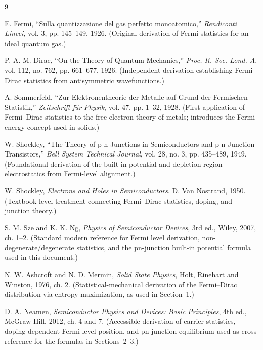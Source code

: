 \documentclass[11pt]{article}
\begin{document}
\begin{thebibliography}{9}

E. Fermi, ``Sulla quantizzazione del gas perfetto monoatomico,'' \emph{Rendiconti Lincei}, vol. 3, pp. 145--149, 1926. (Original derivation of Fermi statistics for an ideal quantum gas.)

P. A. M. Dirac, ``On the Theory of Quantum Mechanics,'' \emph{Proc. R. Soc. Lond. A}, vol. 112, no. 762, pp. 661--677, 1926. (Independent derivation establishing Fermi--Dirac statistics from antisymmetric wavefunctions.)

A. Sommerfeld, ``Zur Elektronentheorie der Metalle auf Grund der Fermischen Statistik,'' \emph{Zeitschrift f\"ur Physik}, vol. 47, pp. 1--32, 1928. (First application of Fermi--Dirac statistics to the free-electron theory of metals; introduces the Fermi energy concept used in solids.)

W. Shockley, ``The Theory of p-n Junctions in Semiconductors and p-n Junction Transistors,'' \emph{Bell System Technical Journal}, vol. 28, no. 3, pp. 435--489, 1949. (Foundational derivation of the built-in potential and depletion-region electrostatics from Fermi-level alignment.)

W. Shockley, \emph{Electrons and Holes in Semiconductors}, D. Van Nostrand, 1950. (Textbook-level treatment connecting Fermi--Dirac statistics, doping, and junction theory.)

S. M. Sze and K. K. Ng, \emph{Physics of Semiconductor Devices}, 3rd ed., Wiley, 2007, ch. 1--2. (Standard modern reference for Fermi level derivation, non-degenerate/degenerate statistics, and the pn-junction built-in potential formula used in this document.)

N. W. Ashcroft and N. D. Mermin, \emph{Solid State Physics}, Holt, Rinehart and Winston, 1976, ch. 2. (Statistical-mechanical derivation of the Fermi--Dirac distribution via entropy maximization, as used in Section~1.)

D. A. Neamen, \emph{Semiconductor Physics and Devices: Basic Principles}, 4th ed., McGraw-Hill, 2012, ch. 4 and 7. (Accessible derivation of carrier statistics, doping-dependent Fermi level position, and pn-junction equilibrium used as cross-reference for the formulas in Sections~2--3.)

\end{thebibliography}
\end{document}
